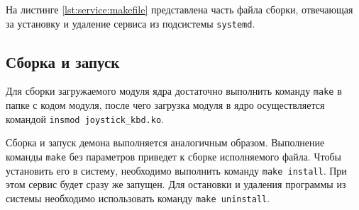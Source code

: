 На листинге \ref{lst:service:makefile} представлена часть файла сборки, отвечающая за установку и удаление сервиса из подсистемы \texttt{systemd}.


\subsection{Сборка и запуск}

Для сборки загружаемого модуля ядра достаточно выполнить команду \texttt{make} в папке с кодом модуля, после чего загрузка модуля в ядро осуществляется командой \texttt{insmod joystick\_kbd.ko}.

Сборка и запуск демона выполняется аналогичным образом. Выполнение команды \texttt{make} без параметров приведет к сборке исполняемого файла. Чтобы установить его в систему, необходимо выполнить команду \texttt{make install}. При этом сервис будет сразу же запущен. Для остановки и удаления программы из системы необходимо использовать команду \texttt{make uninstall}.

\pagebreak
